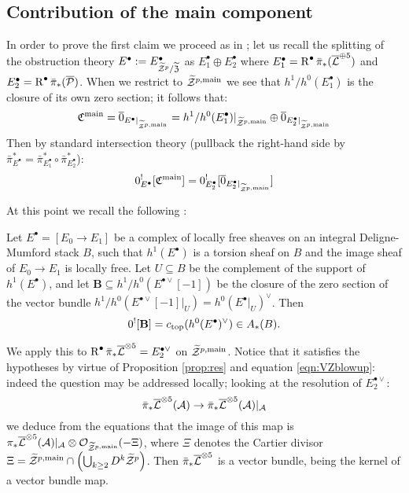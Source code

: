 \subsection{Contribution of the main component}
In order to prove the first claim we proceed as in \cite[\S5]{CLpfields}; let us recall the splitting of the obstruction theory $E^{\bullet}:=E^{\bullet}_{\widetilde{\mathcal Z}^p/\widetilde{\mathfrak Z}}$ as $E^{\bullet}_1\oplus E^{\bullet}_2$ where $E^{\bullet}_1=\operatorname{R}^{\bullet}\bar\pi_*(\overline{\mathcal{L}}^{\oplus 5})$ and $E^{\bullet}_2=\operatorname{R}^{\bullet}\bar\pi_*(\overline{\mathcal P})$. When we restrict to $\widetilde{\mathcal Z}^{p,\rm{main}}$ we see that $h^1/h^0(E^{\bullet}_1)$ is the closure of its own zero section; it follows that:
\[
 \mathfrak C^{\rm{main}}=\overline{0}_{E^{\bullet}\rvert_{\widetilde{\mathcal Z}^{p,\rm{main}}}}=h^1/h^0(E^{\bullet}_1)\rvert_{\widetilde{\mathcal Z}^{p,\rm{main}}}\oplus \overline{0}_{E^{\bullet}_2\rvert_{\widetilde{\mathcal Z}^{p,\rm{main}}}}
\]
Then by standard intersection theory (pullback the right-hand side by $\bar\pi_{E^{\bullet}}^*=\bar\pi_{E^{\bullet}_1}^*\circ\bar\pi_{E^{\bullet}_2}^*$):
\[
 0^!_{E^{\bullet}}[\mathfrak C^{\rm{main}}]=0_{E^{\bullet}_2}^![\overline{0}_{E^{\bullet}_2\rvert_{\widetilde{\mathcal Z}^{p,\rm{main}}}}]
\]

At this point we recall the following \cite[Lemma 5.3]{CLpfields}:
\begin{lem}
Let $E^{\bullet}=[E_0\to E_1]$ be a complex of locally free sheaves on an integral Deligne-Mumford stack $B$, such that
$h^1(E^{\bullet})$ is a torsion sheaf on $B$ and the image sheaf of $E_0\to E_1$ is locally free.
Let $U\subseteq B$ be the complement of the support of $h^1(E^{\bullet})$, and let $\mathbf{B}\subseteq h^1/h^0(E^{\bullet\vee}[-1])$
be the closure of the zero section  of the vector bundle $h^1/h^0(E^{\bullet\vee}[-1]|_U)= h^0(E^{\bullet}|_U)^\vee$. Then
$$0^![\mathbf{B}]=c_{\rm{top}}(h^0(E^{\bullet})^\vee)\in A_*(B).
$$
\end{lem}

We apply this to $\operatorname{R}^{\bullet}\bar{\pi}_*\overline{\mathcal{L}}^{\otimes 5}=E^{\bullet\vee}_2$ on $\widetilde{\mathcal Z}^{p,\rm{main}}$. Notice that it satisfies the hypotheses by virtue of Proposition \ref{prop:res} and equation \eqref{eqn:VZblowup}: indeed the question may be addressed locally; looking at the resolution of $E^{\bullet\vee}_2$:
\[
 \bar\pi_*\overline{\mathcal{L}}^{\otimes 5}(\mathcal A)\rightarrow \bar\pi_*\overline{\mathcal{L}}^{\otimes 5}(\mathcal A)\rvert_{\mathcal A}
\]
we deduce from the equations that the image of this map is $\pi_*\overline{\mathcal{L}}^{\otimes 5}(\mathcal A)\rvert_{\mathcal A}\otimes\mathcal{O}_{\widetilde{\mathcal Z}^{p,\rm{main}}}(-\Xi)$, where $\Xi$ denotes the Cartier divisor $\Xi=\widetilde{\mathcal Z}^{p,\rm{main}}\cap\left(\bigcup_{k\geq 2}D^k\widetilde{\mathcal Z}^p\right)$. Then $\bar\pi_*\overline{\mathcal{L}}^{\otimes 5}$ is a vector bundle, being the kernel of a vector bundle map.

